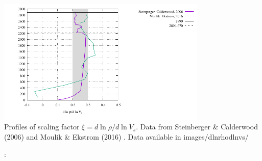 \begin{center}
\includegraphics[height=6cm]{images/dlnvsdlnrho/xi.pdf}\\
{\captionfont Profiles of scaling factor $\xi=d \ln \rho/d\ln V_s$. Data from 
Steinberger \& Calderwood (2006) \cite{stca06} and Moulik \& Ekstrom (2016) \cite{moek16}.
Data available in images/dlnrhodlnvs/} 
\end{center}



\Literature: \cite{roma01}
